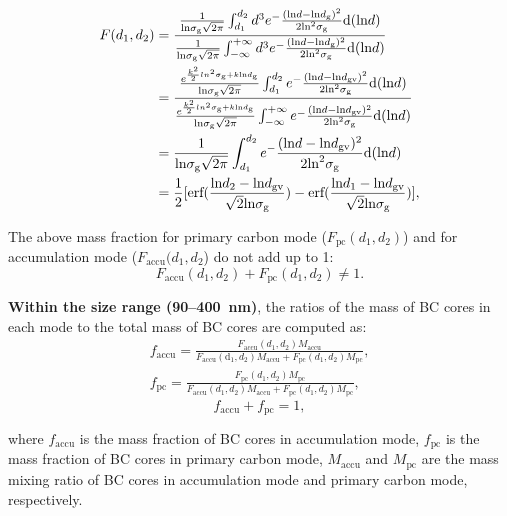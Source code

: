 \documentclass[12pt, fullpage]{uiucthesis2009}
\begin{document}
	\begin{align*}
	F(d_{1}, d_{2}) &= \frac{\frac{1}{\text{ln}\sigma_{\text{g}}\sqrt{2\pi}}\int_{d_{1}}^{d_{2}}d^3e^-\frac{(\text{ln}d - \text{ln}d_{\rm g})^2}{2\text{ln}^2\sigma_{\text{g}}}\text{d}(\text{ln}d)}
	{\frac{1}{\text{ln}\sigma_{\text{g}}\sqrt{2\pi}}\int_{-\infty}^{+\infty}d^3e^-\frac{(\text{ln}d - \text{ln}d_{\rm g})^2}{2\text{ln}^2\sigma_{\text{g}}}\text{d}(\text{ln}d)}  \\
	&=\frac{\frac{e^{\frac{k^2}{2}ln^2\sigma_{\rm g}+k\text{ln}d_{\rm g}}}{\text{ln}\sigma_{\text{g}}\sqrt{2\pi}}\int_{d_{1}}^{d_{2}}e^-\frac{(\text{ln}d - \text{ln}d_{\text{gv}})^2}{2\text{ln}^2\sigma_{\text{g}}}\text{d}(\text{ln}d)}{\frac{e^{\frac{k^2}{2}ln^2\sigma_{\rm g}+k\text{ln}d_{\rm g}}}{\text{ln}\sigma_{\text{g}}\sqrt{2\pi}}\int_{-\infty}^{+\infty}e^-\frac{(\text{ln}d - \text{ln}d_{\text{gv}})^2}{2\text{ln}^2\sigma_{\text{g}}}\text{d}(\text{ln}d)}\\
	&=\frac{1}{\text{ln}\sigma_{\text{g}}\sqrt{2\pi}}\int_{d_{1}}^{d_{2}}e^-\frac{(\text{ln}d - \text{ln}d_{\text{gv}})^2}{2\text{ln}^2\sigma_{\text{g}}}\text{d}(\text{ln}d) \\
	&=\frac{1}{2}[\text{erf}(\frac{\text{ln}d_{2} - \text{ln}d_{\text{gv}}}{\sqrt{2}\text{ln}\sigma_{\rm g}})-\text{erf}(\frac{\text{ln}d_{1} - \text{ln}d_{\text{gv}}}{\sqrt{2}\text{ln}\sigma_{\rm g}})],
	\end{align*}
	
	The above mass fraction for primary carbon mode ($F_{\text{pc}}(d_{1}, d_{2})$) and for accumulation mode ($F_{\text{accu}}(d_{1}, d_{2}$) do not add up to 1:
	\[F_{\text{accu}}(d_{1}, d_{2}) + F_{\text{pc}}(d_{1}, d_{2}) \neq 1.\]
	
	\textbf{Within the size range (90--400~nm)}, the ratios of the mass of BC cores in each mode to the total mass of BC cores are computed as:
	\begin{align*}
	f_{\text{accu}} = \frac{F_{\text{accu}}(d_{1}, d_{2})M_{\text{accu}}}{F_{\text{accu}}(\text{d}_{1}, d_{2})M_{\text{accu}}+F_{\text{pc}}(d_{1}, d_{2})M_{\text{pc}}},\\
	f_{\text{pc}} = \frac{F_{\text{pc}}(d_{1}, d_{2})M_{\text{pc}}}{F_{\text{accu}}(d_{1}, d_{2})M_{\text{accu}}+F_{\text{pc}}(d_{1}, d_{2})M_{\text{pc}}},
	\end{align*}
	\[f_{\text{accu}} + f_{\text{pc}} = 1,\]
	
	where $f_{\text{accu}}$ is the mass fraction of BC cores in
	accumulation mode, $f_{\text{pc}}$ is the mass fraction of BC cores in
	primary carbon mode, $M_{\text{accu}}$ and $M_{\text{pc}}$ are the mass mixing ratio of BC cores
	in accumulation mode and primary carbon mode, respectively.
	
\end{document}

